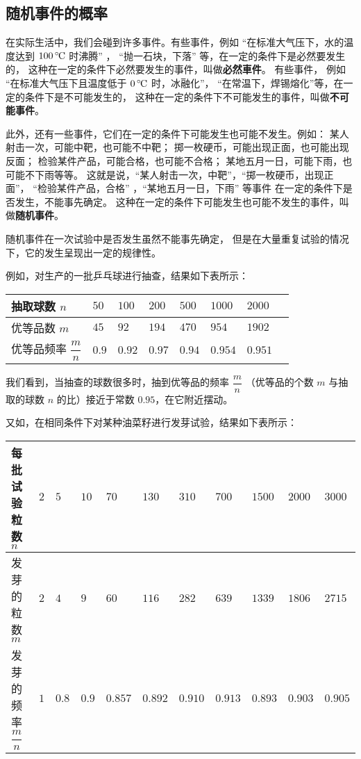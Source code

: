 \subsection{随机事件的概率}\label{subsec:3-1}

在实际生活中，我们会碰到许多事件。有些事件，例如
“在标准大气压下，水的温度达到 $100 \, \celsius$ 时沸腾” ，
“抛一石块，下落” 等，在一定的条件下是必然要发生的，
这种在一定的条件下必然要发生的事件，叫做\textbf{必然車件}。
有些事件， 例如
“在标准大气压下且温度低于 $0 \, \celsius$ 时，冰融化”，
“在常温下，焊锡熔化”等，在一定的条件下是不可能发生的，
这种在一定的条件下不可能发生的事件，叫做\textbf{不可能事件}。


此外，还有一些事件，它们在一定的条件下可能发生也可能不发生。例如：
某人射击一次，可能中靶，也可能不中靶；
掷一枚硬币，可能出现正面，也可能出现反面；
检验某件产品，可能合格，也可能不合格；
某地五月一日，可能下雨，也可能不下雨等等。
这就是说，“某人射击一次，中靶”，“掷一枚硬币，出现正面”，
“检验某件产品，合格” ，“某地五月一日，下雨” 等事件
在一定的条件下是否发生，不能事先确定。
这种在一定的条件下可能发生也可能不发生的事件，叫做\textbf{随机事件}。


随机事件在一次试验\footnotemark 中是否发生虽然不能事先确定，
但是在大量重复试验的情况下，它的发生呈现出一定的规律性。


例如，对生产的一批乒乓球进行抽查，结果如下表所示：

\begin{tabular}{|w{c}{7em}|*{7}{w{c}{2.5em}|}}
    \hline
    抽取球数 $n$              & $50$  & $100$  & $200$  & $500$  & $1000$  & $2000$  \\ \hline
    优等品数 $m$              & $45$  & $92$   & $194$  & $470$  & $954$   & $1902$  \\ \hline
    优等品频率 $\dfrac{m}{n}$ & $0.9$ & $0.92$ & $0.97$ & $0.94$ & $0.954$ & $0.951$ \rule{0pt}{1.5em} \\[0.5em] \hline
\end{tabular}


我们看到，当抽查的球数很多时，抽到优等品的频率 $\dfrac{m}{n}$
（优等品的个数 $m$ 与抽取的球数 $n$ 的比）接近于常数 $0.95$，在它附近摆动。

又如，在相同条件下对某种油菜籽进行发芽试验，结果如下表所示：

\begin{tabular}{|w{c}{7em}|*{10}{w{c}{2em}|}}
    \hline
    每批试验粒数 $n$          & $2$ & $5$   & $10$  & $70$    & $130$   & $310$   & $700$   & $1500$  & $2000$  & $3000$ \\ \hline
    发芽的粒数 $m$            & $2$ & $4$   & $9$   & $60$    & $116$   & $282$   & $639$   & $1339$  & $1806$  & $2715$ \\ \hline
    发芽的频率 $\dfrac{m}{n}$ & $1$ & $0.8$ & $0.9$ & $0.857$ & $0.892$ & $0.910$ & $0.913$ & $0.893$ & $0.903$ & $0.905$ \rule{0pt}{1.5em} \\[0.5em] \hline
\end{tabular}


